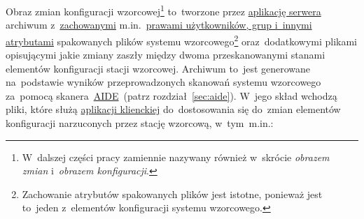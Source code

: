 \documentclass[thesis]{subfiles}
\begin{document}
Obraz zmian konfiguracji wzorcowej\footnote{W~dalszej części pracy zamiennie nazywany również w~skrócie \emph{obrazem zmian} i~\emph{obrazem konfiguracji}.} to~tworzone przez \hyperref[sec:srv-app]{aplikację serwera} archiwum \targz{} z~\href{https://unix.stackexchange.com/questions/43605/how-do-i-copy-a-folder-keeping-owners-and-permissions-intact}{zachowanymi} m.in.~\href{https://wiki.archlinux.org/index.php/File_permissions_and_attributes}{prawami użytkowników, grup i~innymi atrybutami} spakowanych plików systemu wzorcowego\footnote{Zachowanie atrybutów spakowanych plików jest istotne, ponieważ jest to~jeden z~elementów konfiguracji systemu wzorcowego.} oraz~dodatkowymi plikami opisującymi jakie zmiany zaszły między dwoma przeskanowanymi stanami elementów konfiguracji stacji wzorcowej. Archiwum to~jest generowane na~podstawie wyników przeprowadzonych skanowań systemu wzorcowego za~pomocą skanera~\hyperref[sec:aide]{AIDE}~(patrz rozdział~\ref{sec:aide}). W~jego skład wchodzą pliki, które służą \hyperref[sec:cli-app]{aplikacji klienckiej} do~dostosowania się do~zmian elementów konfiguracji narzuconych przez stację wzorcową, w~tym~m.in.:\mynobreakpar
\end{document}
